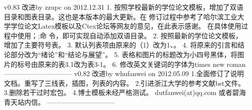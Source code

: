 v0.83 改进by zzupc on 2012.12.31
1. 按照学校最新的学位论文模板，增加了双语目录和图表目录。这也是本版本的最大更新。在
修订过程中参考了哈尔滨工业大学学位论文Latex模板以及Ctex论坛等网友的意见，在此表示感谢。
在具体使用过程中使用；\BiSection{}{};\BiSubsection{}{}命
令，即可实现自动添加双语目录。
2. 按照最新的学位论文模板，增加了主要符号表。
3. 默认列表项由原来的（1）改为1、。
4. 将原来的引言和结论部分改为“绪论”和“结论与展望”。
5. 表格和图片的标题改为小四号黑体，将图片的标号由原来的表3.1改为表3-1。
6. 修改英文关键词的字体为times new roman
------------------------------
v0.82 改进by whufanwei on 2012.05.09
1.全面修订了说明文档。重写了三线表，插图，列表的内容。
2.引进浙江大学的参考文献bst文件。
3.删除若干过时宏包。
4.博士模板未经严格测试。
dutfanwei(at)qq.com
或者碧海青天站内信。
------------------------------
